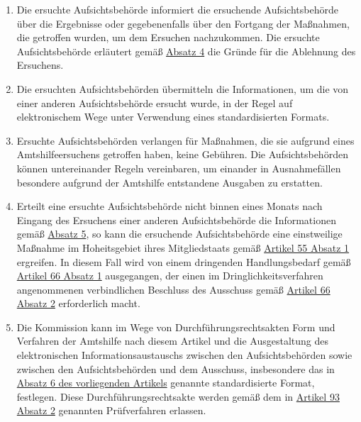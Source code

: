 \begin{enumerate}
\begin{enumerate}
  \end{enumerate}

  \item Die ersuchte Aufsichtsbehörde informiert die ersuchende Aufsichtsbehörde über die Ergebnisse oder gegebenenfalls
   über den Fortgang der Maßnahmen, die getroffen wurden, um dem Ersuchen nachzukommen. Die ersuchte Aufsichtsbehörde
   erläutert gemäß \hyperref[itm:61-4]{Absatz 4} die Gründe für die Ablehnung des Ersuchens.
  \label{itm:61-5}

  \item Die ersuchten Aufsichtsbehörden übermitteln die Informationen, um die von einer anderen Aufsichtsbehörde ersucht
   wurde, in der Regel auf elektronischem Wege unter Verwendung eines standardisierten Formats.
  \label{itm:61-6}

  \item Ersuchte Aufsichtsbehörden verlangen für Maßnahmen, die sie aufgrund eines Amtshilfeersuchens getroffen haben,
   keine Gebühren. Die Aufsichtsbehörden können untereinander Regeln vereinbaren, um einander in Ausnahmefällen
   besondere aufgrund der Amtshilfe entstandene Ausgaben zu erstatten.
  \label{itm:61-7}

  \item Erteilt eine ersuchte Aufsichtsbehörde nicht binnen eines Monats nach Eingang des Ersuchens einer anderen
   Aufsichtsbehörde die Informationen gemäß \hyperref[itm:61-5]{Absatz 5}, so kann die ersuchende Aufsichtsbehörde eine
   einstweilige Maßnahme im Hoheitsgebiet ihres Mitgliedstaats gemäß \hyperref[itm:55-1]{Artikel 55 Absatz 1}
   ergreifen. In diesem Fall wird von einem dringenden Handlungsbedarf gemäß \hyperref[itm:66-1]{Artikel 66 Absatz 1}
   ausgegangen, der einen im Dringlichkeitsverfahren angenommenen verbindlichen Beschluss des Ausschuss gemäß \hyperref
   [itm:66-2]{Artikel 66 Absatz 2} erforderlich macht.
  \label{itm:61-8}

  \item Die Kommission kann im Wege von Durchführungsrechtsakten Form und Verfahren der Amtshilfe nach diesem Artikel
   und die Ausgestaltung des elektronischen Informationsaustauschs zwischen den Aufsichtsbehörden sowie zwischen den
   Aufsichtsbehörden und dem Ausschuss, insbesondere das in \hyperref[itm:61-1]{Absatz 6 des vorliegenden Artikels}
   genannte standardisierte Format, festlegen. Diese Durchführungsrechtsakte werden gemäß dem in \hyperref[itm:93-2]
   {Artikel 93 Absatz 2} genannten Prüfverfahren erlassen.
  \label{itm:61-9}

\end{enumerate}


